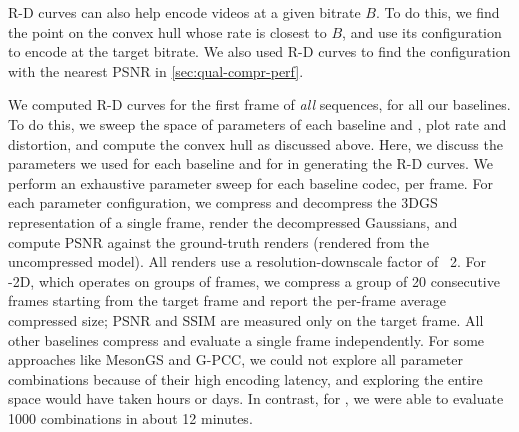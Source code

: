 R-D curves can also help encode videos at a given bitrate $B$.
%
To do this, we find the point on the convex hull whose rate is closest to $B$, and use its configuration to encode at the target bitrate.
%
We also used R-D curves to find the \gsnfs{} configuration with the nearest PSNR in \cref{sec:qual-compr-perf}.

%
We computed R-D curves for the first frame of \textit{all} sequences, for all our baselines.
%
To do this, we sweep the space of parameters of each baseline and \gsnfs{}, plot rate and distortion, and compute the convex hull as discussed above.
%
Here, we discuss the parameters we used for each baseline and for \gsnfs{} in generating the R-D curves.
%
We perform an exhaustive parameter sweep for each baseline codec, per frame.
%
For each parameter configuration, we compress and decompress the 3DGS representation of a single frame, render the decompressed Gaussians, and compute PSNR against the ground-truth renders (rendered from the uncompressed model).
%
All renders use a resolution-downscale factor of ~2.
%
For \vthree{}-2D, which operates on groups of frames, we compress a group of 20 consecutive frames starting from the target frame and report the per-frame average compressed size; PSNR and SSIM are measured only on the target frame. 
%
All other baselines compress and evaluate a single frame independently.
%
For some approaches like MesonGS and G-PCC, we could not explore all parameter combinations because of their high encoding latency, and exploring the entire space would have taken hours or days.
%
In contrast, for \gsnfs{}, we were able to evaluate 1000 combinations in about 12 minutes.

